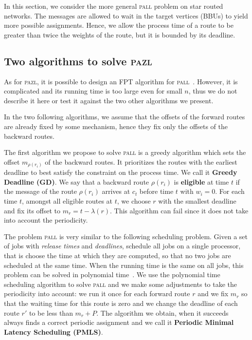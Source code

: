 \documentclass[a4paper,10pt]{IEEEtran}
\newcommand\pazl{\textsc{pazl}\xspace}
\newcommand\pall{\textsc{pall}\xspace}
\begin{document}
    In this section, we consider the more general \pall problem on star routed networks. The messages are allowed to wait in the target vertices (BBUs) to yield more possible assignments. Hence, we allow the process time of a route to be greater than twice the weights of the route, but it is bounded by its deadline.
  
  \subsection{Two algorithms to solve \pazl}
  
  As for \pazl, it is possible to design an FPT algorithm for \pall~\cite{versionlongue}. 
  However, it is complicated and its running time is too large even for small $n$,
  thus we do not describe it here or test it against the two other algorithms we present.
  
  In the two following algorithms, we assume that the offsets of the forward routes are already fixed by some mechanism, hence they fix only the offsets of the backward routes. 
    
    The first algorithm we propose to solve \pall is a greedy algorithm which sets the offset $m_{\rho(r_i)}$ of the 
    backward routes. It prioritizes the routes with the earliest deadline to best satisfy the
    constraint on the process time. We call it \textbf{Greedy Deadline (GD)}. We say that a backward route $\rho(r_i)$ is {\bf eligible} at time $t$ if the message of the route $\rho(r_i)$ arrives at $c_t$ before time $t$ with $w_i = 0$. For each time $t$, amongst all eligible routes at $t$, we choose $r$ with the smallest deadline and fix its offset to $m_r = t - \lambda(r)$.
    This algorithm can fail since it does not take into account the periodicity.
    
     The problem \pall is very similar to the following scheduling problem. Given a set of jobs with \emph{release times} and  \emph{deadlines}, schedule all jobs on a single processor, that is choose the time at which they are computed, so that no two jobs are scheduled at the same time. When the running time is the same on all jobs, this problem can be solved in polynomial time~\cite{simons1978fast}. We use the polynomial time scheduling algorithm to solve \pall and we make some adjustments to take the periodicity into account: we run it once for each forward route $r$ and we fix $m_r$ so that the waiting time for this route is zero and we change the deadline of each route $r'$ to be less than $m_{r} + P$. The algorithm we obtain, when it succeeds always finds a correct periodic assignment and we call it {\bf Periodic Minimal Latency Scheduling (PMLS)}.
\end{document}
